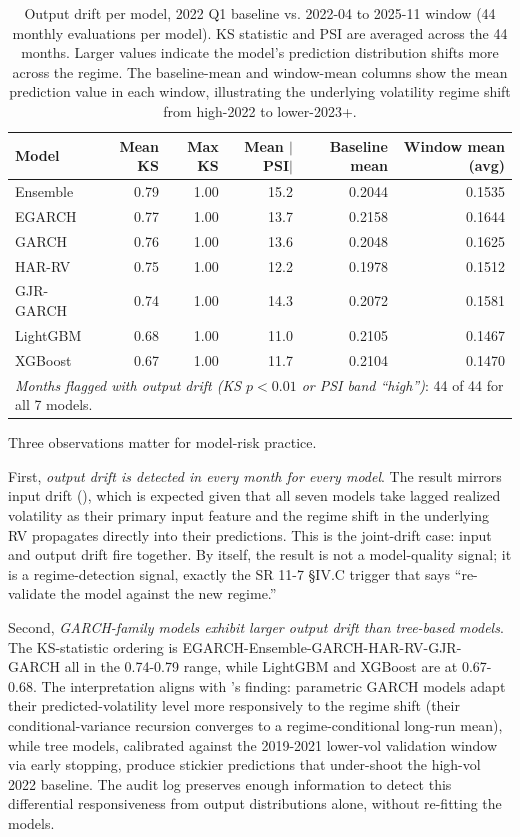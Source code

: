 \begin{table}[H]
\centering
\caption{Output drift per model, 2022 Q1 baseline vs. 2022-04 to 2025-11 window (44 monthly evaluations per model). KS statistic and PSI are averaged across the 44 months. Larger values indicate the model's prediction distribution shifts more across the regime. The baseline-mean and window-mean columns show the mean prediction value in each window, illustrating the underlying volatility regime shift from high-2022 to lower-2023+.}\label{tab:output_drift}
\footnotesize
\begin{tabular}{lrrrrr}
\toprule
Model & Mean KS & Max KS & Mean $|$PSI$|$ & Baseline mean & Window mean (avg) \\
\midrule
Ensemble  & 0.79 & 1.00 & 15.2 & 0.2044 & 0.1535 \\
EGARCH    & 0.77 & 1.00 & 13.7 & 0.2158 & 0.1644 \\
GARCH     & 0.76 & 1.00 & 13.6 & 0.2048 & 0.1625 \\
HAR-RV    & 0.75 & 1.00 & 12.2 & 0.1978 & 0.1512 \\
GJR-GARCH & 0.74 & 1.00 & 14.3 & 0.2072 & 0.1581 \\
LightGBM  & 0.68 & 1.00 & 11.0 & 0.2105 & 0.1467 \\
XGBoost   & 0.67 & 1.00 & 11.7 & 0.2104 & 0.1470 \\
\midrule
\multicolumn{6}{l}{\textit{Months flagged with output drift (KS $p<0.01$ or PSI band ``high'')}: 44 of 44 for all 7 models.} \\
\bottomrule
\end{tabular}
\end{table}

Three observations matter for model-risk practice.

First, \emph{output drift is detected in every month for every model}. The result mirrors input drift (), which is expected given that all seven models take lagged realized volatility as their primary input feature and the regime shift in the underlying RV propagates directly into their predictions. This is the joint-drift case: input and output drift fire together. By itself, the result is not a model-quality signal; it is a regime-detection signal, exactly the SR 11-7 §IV.C trigger that says ``re-validate the model against the new regime.''

Second, \emph{GARCH-family models exhibit larger output drift than tree-based models}. The KS-statistic ordering is EGARCH-Ensemble-GARCH-HAR-RV-GJR-GARCH all in the 0.74-0.79 range, while LightGBM and XGBoost are at 0.67-0.68. The interpretation aligns with \citet{KhanVol2026}'s finding: parametric GARCH models adapt their predicted-volatility level more responsively to the regime shift (their conditional-variance recursion converges to a regime-conditional long-run mean), while tree models, calibrated against the 2019-2021 lower-vol validation window via early stopping, produce stickier predictions that under-shoot the high-vol 2022 baseline. The audit log preserves enough information to detect this differential responsiveness from output distributions alone, without re-fitting the models.

